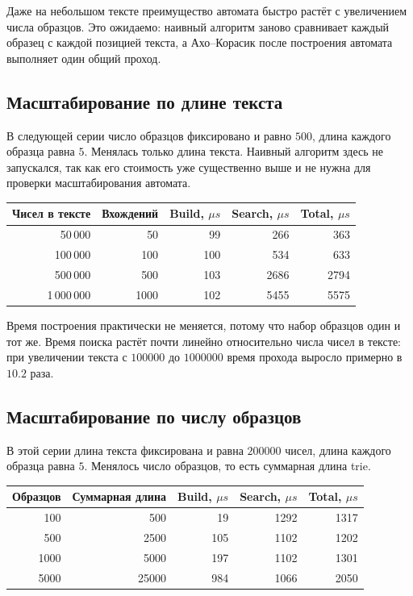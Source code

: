 Даже на небольшом тексте преимущество автомата быстро растёт с увеличением числа образцов. Это
ожидаемо: наивный алгоритм заново сравнивает каждый образец с каждой позицией текста, а
Ахо--Корасик после построения автомата выполняет один общий проход.

\subsection{Масштабирование по длине текста}

В следующей серии число образцов фиксировано и равно \(500\), длина каждого образца равна \(5\).
Менялась только длина текста. Наивный алгоритм здесь не запускался, так как его стоимость уже
существенно выше и не нужна для проверки масштабирования автомата.

\begin{center}
\begin{tabular}{|r|r|r|r|r|}
\hline
\rowcolor{lightgray}
Чисел в тексте & Вхождений & Build, \(\mu s\) & Search, \(\mu s\) & Total, \(\mu s\) \\
\hline
50\,000 & 50 & 99 & 266 & 363 \\
\hline
100\,000 & 100 & 100 & 534 & 633 \\
\hline
500\,000 & 500 & 103 & 2686 & 2794 \\
\hline
1\,000\,000 & 1000 & 102 & 5455 & 5575 \\
\hline
\end{tabular}
\end{center}

Время построения практически не меняется, потому что набор образцов один и тот же. Время поиска растёт
почти линейно относительно числа чисел в тексте: при увеличении текста с \(100000\) до \(1000000\)
время прохода выросло примерно в \(10.2\) раза.

\subsection{Масштабирование по числу образцов}

В этой серии длина текста фиксирована и равна \(200000\) чисел, длина каждого образца равна \(5\).
Менялось число образцов, то есть суммарная длина trie.

\begin{center}
\begin{tabular}{|r|r|r|r|r|}
\hline
\rowcolor{lightgray}
Образцов & Суммарная длина & Build, \(\mu s\) & Search, \(\mu s\) & Total, \(\mu s\) \\
\hline
100 & 500 & 19 & 1292 & 1317 \\
\hline
500 & 2500 & 105 & 1102 & 1202 \\
\hline
1000 & 5000 & 197 & 1102 & 1301 \\
\hline
5000 & 25000 & 984 & 1066 & 2050 \\
\hline
\end{tabular}
\end{center}

